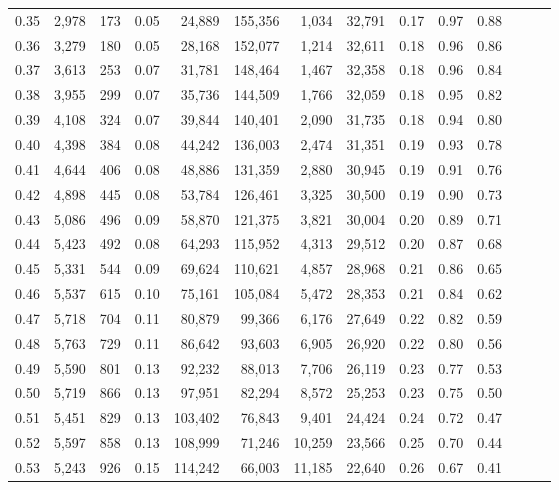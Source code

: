 \begin{tabular}{rrrrrrrrrrrrrr}
0.35 &  2,978 &    173 &  0.05 &   24,889 &  155,356 &   1,034 &  32,791 &  0.17 &  0.97 &      0.88 \\
0.36 &  3,279 &    180 &  0.05 &   28,168 &  152,077 &   1,214 &  32,611 &  0.18 &  0.96 &      0.86 \\
0.37 &  3,613 &    253 &  0.07 &   31,781 &  148,464 &   1,467 &  32,358 &  0.18 &  0.96 &      0.84 \\
0.38 &  3,955 &    299 &  0.07 &   35,736 &  144,509 &   1,766 &  32,059 &  0.18 &  0.95 &      0.82 \\
0.39 &  4,108 &    324 &  0.07 &   39,844 &  140,401 &   2,090 &  31,735 &  0.18 &  0.94 &      0.80 \\
0.40 &  4,398 &    384 &  0.08 &   44,242 &  136,003 &   2,474 &  31,351 &  0.19 &  0.93 &      0.78 \\
0.41 &  4,644 &    406 &  0.08 &   48,886 &  131,359 &   2,880 &  30,945 &  0.19 &  0.91 &      0.76 \\
0.42 &  4,898 &    445 &  0.08 &   53,784 &  126,461 &   3,325 &  30,500 &  0.19 &  0.90 &      0.73 \\
0.43 &  5,086 &    496 &  0.09 &   58,870 &  121,375 &   3,821 &  30,004 &  0.20 &  0.89 &      0.71 \\
0.44 &  5,423 &    492 &  0.08 &   64,293 &  115,952 &   4,313 &  29,512 &  0.20 &  0.87 &      0.68 \\
0.45 &  5,331 &    544 &  0.09 &   69,624 &  110,621 &   4,857 &  28,968 &  0.21 &  0.86 &      0.65 \\
0.46 &  5,537 &    615 &  0.10 &   75,161 &  105,084 &   5,472 &  28,353 &  0.21 &  0.84 &      0.62 \\
0.47 &  5,718 &    704 &  0.11 &   80,879 &   99,366 &   6,176 &  27,649 &  0.22 &  0.82 &      0.59 \\
0.48 &  5,763 &    729 &  0.11 &   86,642 &   93,603 &   6,905 &  26,920 &  0.22 &  0.80 &      0.56 \\
0.49 &  5,590 &    801 &  0.13 &   92,232 &   88,013 &   7,706 &  26,119 &  0.23 &  0.77 &      0.53 \\
0.50 &  5,719 &    866 &  0.13 &   97,951 &   82,294 &   8,572 &  25,253 &  0.23 &  0.75 &      0.50 \\
0.51 &  5,451 &    829 &  0.13 &  103,402 &   76,843 &   9,401 &  24,424 &  0.24 &  0.72 &      0.47 \\
0.52 &  5,597 &    858 &  0.13 &  108,999 &   71,246 &  10,259 &  23,566 &  0.25 &  0.70 &      0.44 \\
0.53 &  5,243 &    926 &  0.15 &  114,242 &   66,003 &  11,185 &  22,640 &  0.26 &  0.67 &      0.41 \\

\end{tabular}
